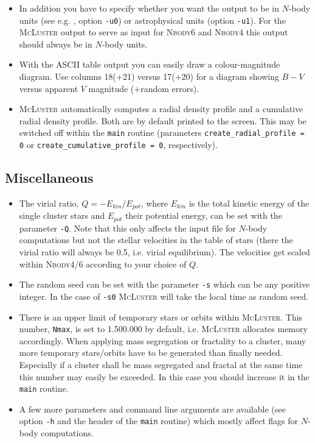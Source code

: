 \documentclass[useAMS,usenatbib]{mn2e}
\begin{document}
\begin{itemize}
\item In addition you have to specify whether you want the output to be in $N$-body units (see e.g. \citealt{Heggie03}, option \texttt{-u0}) or astrophysical units (option \texttt{-u1}). For the \textsc{McLuster} output to serve as input for \textsc{Nbody6} and \textsc{Nbody4} this output should always be in $N$-body units.
\item With the ASCII table output you can easily draw a colour-magnitude diagram. Use columns 18(+21) versus 17(+20) for a diagram showing $B-V$ versus apparent $V$ magnitude (+random errors).
\item \textsc{McLuster} automatically computes a radial density profile and a cumulative radial density profile. Both are by default printed to the screen. This may be switched off within the \texttt{main} routine (parameters \texttt{create\_radial\_profile = 0} or \texttt{create\_cumulative\_profile = 0}, respectively).
\end{itemize}

\subsection*{Miscellaneous}
\begin{itemize}
\item The virial ratio, $Q = -E_{kin}/E_{pot}$, where $E_{kin}$ is the total kinetic energy of the single cluster stars and $E_{pot}$ their potential energy, can be set with the parameter \texttt{-Q}. Note that this only affects the input file for $N$-body computations but not the stellar velocities in the table of stars (there the virial ratio will always be 0.5, i.e. virial equilibrium). The velocities get scaled within \textsc{Nbody4/6} according to your choice of $Q$. 
\item The random seed can be set with the parameter \texttt{-s} which can be any positive integer. In the case of \texttt{-s0} \textsc{McLuster} will take the local time as random seed.
\item There is an upper limit of temporary stars or orbits within \textsc{McLuster}. This number, \texttt{Nmax}, is set to 1.500.000 by default, i.e. \textsc{McLuster} allocates memory accordingly. When applying mass segregation or fractality to a cluster, many more temporary stars/orbits have to be generated than finally needed. Especially if a cluster shall be mass segregated and fractal at the same time this number may easily be exceeded. In this case you should increase it in the \texttt{main} routine. 
\item A few more parameters and command line arguments are available (see option \texttt{-h} and the header of the \texttt{main} routine) which mostly affect flags for $N$-body computations.
\end{itemize}
\end{document}
